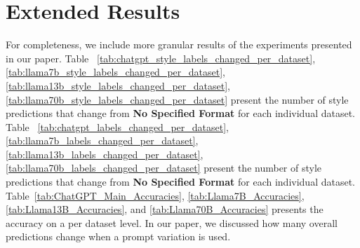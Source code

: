 \documentclass[11pt, dvipsnames]{article}
\begin{document}
\section{Extended Results}
\label{sec:Appendix_Additional_Results}
For completeness, we include more granular results of the experiments presented in our paper.
Table ~\ref{tab:chatgpt_style_labels_changed_per_dataset}, \ref{tab:llama7b_style_labels_changed_per_dataset}, \ref{tab:llama13b_style_labels_changed_per_dataset}, \ref{tab:llama70b_style_labels_changed_per_dataset} present the number of style predictions that change from \textbf{No Specified Format} for each individual dataset.
Table ~\ref{tab:chatgpt_labels_changed_per_dataset}, \ref{tab:llama7b_labels_changed_per_dataset}, \ref{tab:llama13b_labels_changed_per_dataset}, \ref{tab:llama70b_labels_changed_per_dataset} present the number of style predictions that change from \textbf{No Specified Format} for each individual dataset.
Table~\ref{tab:ChatGPT_Main_Accuracies}, \ref{tab:Llama7B_Accuracies}, \ref{tab:Llama13B_Accuracies}, and \ref{tab:Llama70B_Accuracies} presents the accuracy on a per dataset level.
In our paper, we discussed how many overall predictions change when a prompt variation is used. 
\end{document}
